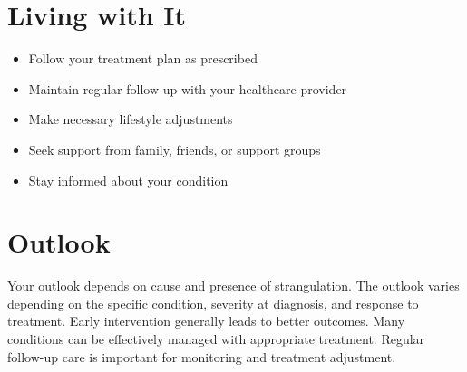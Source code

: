 \section{Living with It}
\begin{itemize}[noitemsep]
  \item Follow your treatment plan as prescribed
  \item Maintain regular follow-up with your healthcare provider
  \item Make necessary lifestyle adjustments
  \item Seek support from family, friends, or support groups
  \item Stay informed about your condition
\end{itemize}
\section{Outlook}
Your outlook depends on cause and presence of strangulation. The outlook varies depending on the specific condition, severity at diagnosis, and response to treatment. Early intervention generally leads to better outcomes. Many conditions can be effectively managed with appropriate treatment. Regular follow-up care is important for monitoring and treatment adjustment.
